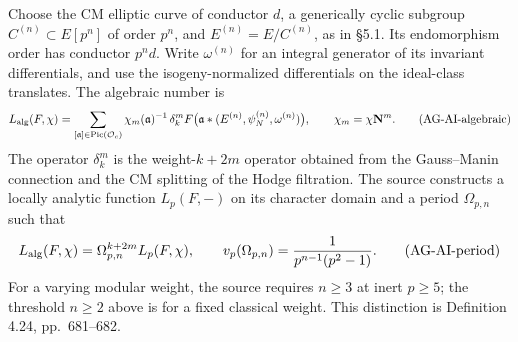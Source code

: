 Choose the CM elliptic curve of conductor $d$, a generically cyclic
subgroup $C^{(n)}\subset E[p^n]$ of order $p^n$, and
$E^{(n)}=E/C^{(n)}$, as in \S5.1.  Its endomorphism order has
conductor $p^n d$.  Write $\omega^{(n)}$ for an integral generator of
its invariant differentials, and use the isogeny-normalized
differentials on the ideal-class translates.  The algebraic number is
\[
 L_{\rm alg}(F,\chi)=
 \sum_{[\mathfrak a]\in\operatorname{Pic}(\mathcal O_c)}
   \chi_m(\mathfrak a)^{-1}\,
   \delta_k^mF\bigl(\mathfrak a*(E^{(n)},\psi_N^{(n)},
                                      \omega^{(n)})\bigr),
 \qquad \chi_m=\chi\mathbf N^m.                         \tag{AG-AI-algebraic}
\]
The operator $\delta_k^m$ is the weight-$k+2m$ operator obtained from
the Gauss--Manin connection and the CM splitting of the Hodge
filtration.  The source constructs a locally analytic function
$L_p(F,-)$ on its character domain and a period $\Omega_{p,n}$ such
that
\[
 L_{\rm alg}(F,\chi)=\Omega_{p,n}^{k+2m}L_p(F,\chi),
 \qquad
 v_p(\Omega_{p,n})=\frac1{p^{n-1}(p^2-1)}.               \tag{AG-AI-period}
\]
For a varying modular weight, the source requires $n\geq3$ at inert
$p\geq5$; the threshold $n\geq2$ above is for a fixed classical
weight.  This distinction is Definition 4.24, pp.~681--682.

